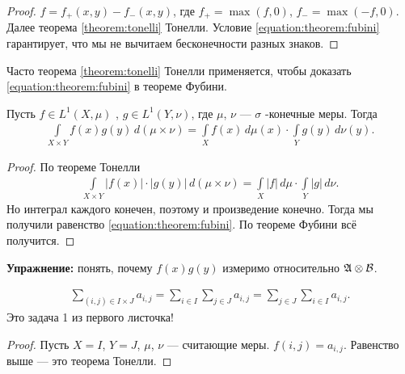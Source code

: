 \begin{proof}
 $f = f_+(x, y) - f_-(x, y)$, где $f_+ = \max(f, 0)$, $f_- = \max(-f, 0)$. Далее теорема \ref{theorem:tonelli} Тонелли. Условие \eqref{equation:theorem:fubini} гарантирует, что мы не вычитаем бесконечности разных знаков.
\end{proof}
\begin{remrk*}
 Часто теорема \ref{theorem:tonelli} Тонелли применяется, чтобы доказать \eqref{equation:theorem:fubini} в теореме Фубини.
\end{remrk*}
\begin{exmpl}
 Пусть $f \in L^{1}(X,\mu)$ , $g \in L^{1}(Y,\nu)$, где $\mu$, $\nu$  --- $\sigma$ -конечные меры. Тогда \begin{align*}
  \int\limits_{X \times Y} f(x)g(y) \, d(\mu \times \nu) = \int\limits_{X} f(x) \, d\mu (x) \cdot \int\limits_{Y} g(y) \, d\nu(y)   
 .\end{align*} 
\end{exmpl}
\begin{proof}
 По теореме Тонелли \begin{align*}
  \int\limits_{X \times Y} \left| f(x) \right| \cdot \left| g(y) \right| \, d(\mu \times \nu)  = \int\limits_{X} \left| f \right| \, d\mu  \cdot \int\limits_{Y} \left| g \right| \, d\nu  
 .\end{align*} Но интеграл каждого конечен, поэтому и произведение конечно. Тогда мы получили равенство \eqref{equation:theorem:fubini}. По теореме Фубини всё получится.
\end{proof}
\textbf{Упражнение:} понять, почему $f(x)g(y)$ измеримо относительно $\mathfrak{A} \otimes \mathcal{B}$.
 
\begin{exmpl}
 \begin{align*}
  \sum_{(i,j) \in I \times J} a_{i,j} = \sum_{i \in I} \sum_{j \in J} a_{i,j} = \sum_{j \in J}  \sum_{i \in I}  a_{i,j}
 .\end{align*} Это задача 1 из первого листочка!
\end{exmpl}
\begin{proof}
 Пусть $X = I$, $Y = J$, $\mu$, $\nu$ --- считающие меры. $f(i,j) = a_{i,j}$. Равенство выше --- это теорема Тонелли.
\end{proof}

